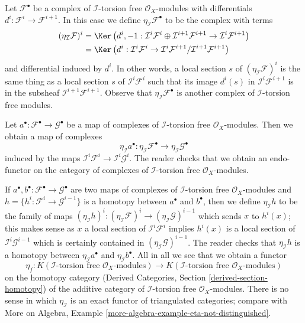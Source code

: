 \medskip\noindent
Let $\mathcal{F}^\bullet$ be a complex of $\mathcal{I}$-torsion free
$\mathcal{O}_X$-modules with
differentials $d^i : \mathcal{F}^i \to \mathcal{F}^{i + 1}$.
In this case we define $\eta_\mathcal{I}\mathcal{F}^\bullet$
to be the complex with terms
\begin{align*}
(\eta_\mathcal{I}\mathcal{F})^i
& =
\Ker\left(
d^i, -1 :
\mathcal{I}^i\mathcal{F}^i \oplus \mathcal{I}^{i + 1}\mathcal{F}^{i + 1}
\to
\mathcal{I}^i\mathcal{F}^{i + 1}
\right) \\
& =
\Ker\left(d^i :
\mathcal{I}^i\mathcal{F}^i
\to
\mathcal{I}^i\mathcal{F}^{i + 1}/
\mathcal{I}^{i + 1}\mathcal{F}^{i + 1}
\right)
\end{align*}
and differential induced by $d^i$. In other words, a local section
$s$ of $(\eta_\mathcal{I}\mathcal{F})^i$ is the same thing as a local section
$s$ of $\mathcal{I}^i\mathcal{F}^i$ such that its image $d^i(s)$
in $\mathcal{I}^i\mathcal{F}^{i + 1}$ is in the subsheaf
$\mathcal{I}^{i + 1}\mathcal{F}^{i + 1}$.
Observe that $\eta_\mathcal{I}\mathcal{F}^\bullet$
is another complex of $\mathcal{I}$-torsion free modules.

\medskip\noindent
Let $a^\bullet : \mathcal{F}^\bullet \to \mathcal{G}^\bullet$ be a map of
complexes of $\mathcal{I}$-torsion free $\mathcal{O}_X$-modules.
Then we obtain a map of complexes
$$
\eta_\mathcal{I} a^\bullet :
\eta_\mathcal{I}\mathcal{F}^\bullet
\longrightarrow
\eta_\mathcal{I}\mathcal{G}^\bullet
$$
induced by the maps
$\mathcal{I}^i\mathcal{F}^i \to \mathcal{I}^i\mathcal{G}^i$.
The reader checks that we obtain
an endo-functor on the category of complexes of
$\mathcal{I}$-torsion free $\mathcal{O}_X$-modules.

\medskip\noindent
If $a^\bullet, b^\bullet : \mathcal{F}^\bullet \to \mathcal{G}^\bullet$
are two maps of
complexes of $\mathcal{I}$-torsion free $\mathcal{O}_X$-modules
and $h = \{h^i : \mathcal{F}^i \to \mathcal{G}^{i - 1}\}$ is a homotopy
between $a^\bullet$ and $b^\bullet$, then we define
$\eta_\mathcal{I}h$ to be the family of maps
$(\eta_\mathcal{I}h)^i : (\eta_\mathcal{I}\mathcal{F})^i \to
(\eta_\mathcal{I}\mathcal{G})^{i - 1}$
which sends $x$ to $h^i(x)$; this makes sense as
$x$ a local section of $\mathcal{I}^i\mathcal{F}^i$
implies $h^i(x)$ is a local section of $\mathcal{I}^i\mathcal{G}^{i - 1}$
which is certainly contained in $(\eta_\mathcal{I}\mathcal{G})^{i - 1}$.
The reader checks that $\eta_\mathcal{I}h$ is a homotopy
between $\eta_\mathcal{I}a^\bullet$ and $\eta_\mathcal{I}b^\bullet$.
All in all we see that we obtain a functor
$$
\eta_f :
K(\mathcal{I}\text{-torsion free }\mathcal{O}_X\text{-modules})
\longrightarrow
K(\mathcal{I}\text{-torsion free }\mathcal{O}_X\text{-modules})
$$
on the homotopy category
(Derived Categories, Section \ref{derived-section-homotopy})
of the additive category of $\mathcal{I}$-torsion free
$\mathcal{O}_X$-modules.
There is no sense in which $\eta_\mathcal{I}$ is an exact functor of
triangulated categories; compare with More on Algebra,
Example \ref{more-algebra-example-eta-not-distinguished}.

